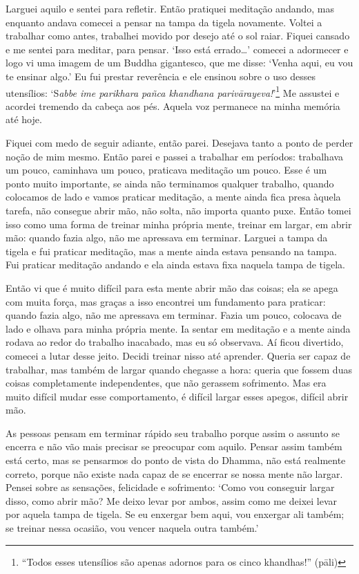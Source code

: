 Larguei aquilo e sentei para refletir. Então pratiquei meditação
andando, mas enquanto andava comecei a pensar na tampa da tigela
novamente. Voltei a trabalhar como antes, trabalhei movido por desejo
até o sol raiar. Fiquei cansado e me sentei para meditar, para pensar.
`Isso está errado\ldots{}' comecei a adormecer e logo vi uma imagem de
um Buddha gigantesco, que me disse: `Venha aqui, eu vou te ensinar
algo.' Eu fui prestar reverência e ele ensinou sobre o uso desses
utensílios: `S\emph{abbe ime parikhara pañca khandhana
parivārayeva!}'\footnote{``Todos esses utensílios são apenas adornos para
  os cinco khandhas!'' (pāli)} Me assustei e acordei tremendo da cabeça
aos pés. Aquela voz permanece na minha memória até hoje.

Fiquei com medo de seguir adiante, então parei. Desejava tanto a ponto
de perder noção de mim mesmo. Então parei e passei a trabalhar em
períodos: trabalhava um pouco, caminhava um pouco, praticava meditação
um pouco. Esse é um ponto muito importante, se ainda não terminamos
qualquer trabalho, quando colocamos de lado e vamos praticar meditação,
a mente ainda fica presa àquela tarefa, não consegue abrir mão, não
solta, não importa quanto puxe. Então tomei isso como uma forma de
treinar minha própria mente, treinar em largar, em abrir mão: quando
fazia algo, não me apressava em terminar. Larguei a tampa da tigela e
fui praticar meditação, mas a mente ainda estava pensando na tampa. Fui
praticar meditação andando e ela ainda estava fixa naquela tampa de
tigela.

Então vi que é muito difícil para esta mente abrir mão das coisas; ela
se apega com muita força, mas graças a isso encontrei um fundamento para
praticar: quando fazia algo, não me apressava em terminar. Fazia um
pouco, colocava de lado e olhava para minha própria mente. Ia sentar em
meditação e a mente ainda rodava ao redor do trabalho inacabado, mas eu
só observava. Aí ficou divertido, comecei a lutar desse jeito. Decidi
treinar nisso até aprender. Queria ser capaz de trabalhar, mas também de
largar quando chegasse a hora: queria que fossem duas coisas
completamente independentes, que não gerassem sofrimento. Mas era muito
difícil mudar esse comportamento, é difícil largar esses apegos, difícil
abrir mão.

As pessoas pensam em terminar rápido seu trabalho porque assim o assunto
se encerra e não vão mais precisar se preocupar com aquilo. Pensar assim
também está certo, mas se pensarmos do ponto de vista do Dhamma, não
está realmente correto, porque não existe nada capaz de se encerrar se
nossa mente não largar. Pensei sobre as sensações, felicidade e
sofrimento: `Como vou conseguir largar disso, como abrir mão? Me deixo
levar por ambos, assim como me deixei levar por aquela tampa de tigela.
Se eu enxergar bem aqui, vou enxergar ali também; se treinar nessa
ocasião, vou vencer naquela outra também.'

